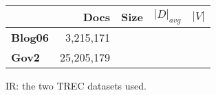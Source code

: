 \begin{figure}
\centering
{\small
\begin{tabular}{|l|r|r|r|r|}
    \hline & \textbf{Docs} & \textbf{Size} & \textbf{$|D|_{avg}$} &
    \textbf{$|V|$} \\
    \hline
    \textbf{Blog06} & 3,215,171 & & & \\
    \textbf{Gov2} & 25,205,179 & & & \\
    \hline
\end{tabular}
}
\caption{IR: the two TREC datasets used.}
\label{fig:ir-datasets}
\end{figure}
